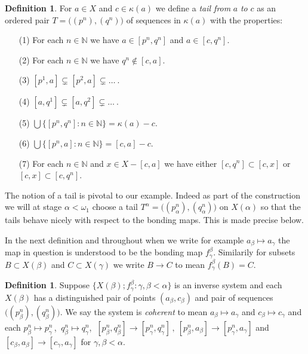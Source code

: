 \documentclass[12pt]{article}
\theoremstyle{plain}
\theoremstyle{definition}
\newtheorem{definition}[theorem]{Definition}
\newcommand{\A}{\ensuremath{\alpha}}
\newcommand{\K}{\ensuremath{\kappa}}
\newcommand{\B}{\ensuremath{\beta}}
\newcommand{\W}{\ensuremath{\omega}}
\newcommand{\G}{\ensuremath{\gamma}}
\newcommand{\NN}{\ensuremath{\mathbb N}}
\newcommand{\0}{\ensuremath{\varnothing}}
\begin{document}
	
	\begin{definition}
		For $a \in X$ and $c \in \K(a)$ we define a \textit{tail from} $a$ \textit{to} $c$ 
		as an ordered pair $T = \big ( (p^n),(q^n) \big )$ of sequences in $\K(a)$ with the properties:
		
		\begin{enumerate}[label=(\arabic*)]
			\item[\normalfont (1)] For each $n \in \NN$ we have $a \in [p^n,q^n]$ and $a \in [c,q^n]$. 
			\item[\normalfont (2)] For each $n \in \NN$ we have  $q^n \notin [c,a]$. 
			\item[\normalfont (3)] $[p^1,a] \varsubsetneq [p^2,a] \varsubsetneq \ldots \ $. 
			\item[\normalfont (4)] $[a,q^1] \varsubsetneq [a,q^2] \varsubsetneq \ldots \ $. 
			\item[\normalfont (5)] $\bigcup  \big \{[p^n,q^n]: n \in \NN \big \} = \K(a) -c$. 
			\item[\normalfont (6)] $\bigcup  \big \{[p^n,a]: n \in \NN \big \} = [c,a] -c$. 
			\item[\normalfont (7)] For each  $n \in \NN$ and $x \in X-[c,a]$ we have  either $[c,q^n] \subset [c,x]$ or $[c,x] \subset [c,q^n]$.
		\end{enumerate}
		
	\end{definition}
	
	The notion of a tail is pivotal to our example. Indeed as part of the construction we will at stage $\A<\W_1$ choose a tail $T^\A = \big ( (p^n_\A),(q^n_\A) \big )$ on $X(\A)$ so that the tails behave nicely with respect to the bonding maps. This is made precise below.
	
	In the next definition and throughout when we write for example \mbox{$a_\B \mapsto a_\G$} the map in question is understood to be the bonding map $f^\B_\G$.
	Similarily for subsets $B \subset X(\B)$ and $C \subset X(\G)$ we write $B \to C$ to mean $f^\B_\G(B) = C$.
	
	
	\begin{definition}\label{deftailmap}
		Suppose $\{X(\B); f^\B_\G: \G,\B < \A\}$ is an inverse system 
		and each $X(\B)$ has a distinguished pair of points $(a_\B,c_\B)$ and pair of sequences $\big ( (p^n_\B),(q^n_\B) \big )$.
		We say the system is \textit{coherent} to mean
		$a_\B \mapsto a_\G$ and $ c_\B \mapsto c_\G$ and each \mbox{$p^n_\B \mapsto p^n_\G \,$}, $ \ q^n_\B \mapsto q^n_\G$,
		$\ [p_\B^n, q_\B^n] \to [p_\G^n, q_\G^n] \,, \  [p_\B^n, a_\B] \to [p_\G^n, a_\G] $ 
		and $[c_\B, a_\B] \to [c_\G, a_\G]$ for $\G,\B < \A $.
	\end{definition}
	
\end{document}
